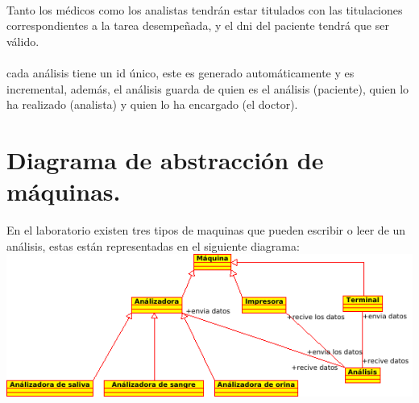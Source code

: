 \documentclass[a4paper,10pt]{article}
\begin{document}
\paragraph{}
Tanto los médicos como los analistas tendrán estar titulados con las titulaciones correspondientes a la tarea desempeñada, y el dni del paciente tendrá que ser válido.
\paragraph{}
cada análisis tiene un id único, este es generado automáticamente y es incremental, además, el análisis guarda de quien es el análisis (paciente), quien lo ha realizado (analista) y quien lo ha encargado (el doctor).
\paragraph{}

\pagebreak

\section{Diagrama de abstracción de máquinas.}
En el laboratorio existen tres tipos de maquinas que pueden escribir o leer de un análisis, estas están representadas en el siguiente diagrama:
\vspace{0.5cm}\\
\includegraphics[width=\textwidth]{img/maquinas.png}
\end{document}

